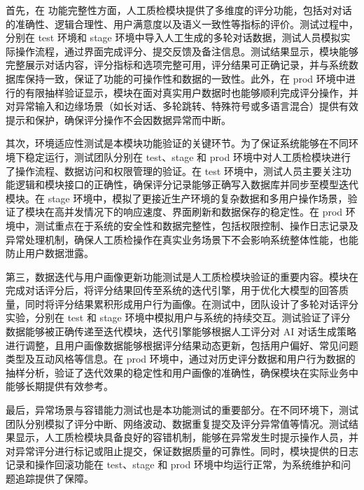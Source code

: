首先，在 功能完整性方面，人工质检模块提供了多维度的评分功能，包括对对话的准确性、逻辑合理性、用户满意度以及语义一致性等指标的评价。测试过程中，分别在 test 环境和 stage 环境中导入人工生成的多轮对话数据，测试人员模拟实际操作流程，通过界面完成评分、提交反馈及备注信息。测试结果显示，模块能够完整展示对话内容，评分指标和选项完整可用，评分结果可正确记录，并与系统数据库保持一致，保证了功能的可操作性和数据的一致性。此外，在 prod 环境中进行的有限抽样验证显示，模块在面对真实用户数据时也能够顺利完成评分操作，并对异常输入和边缘场景（如长对话、多轮跳转、特殊符号或多语言混合）提供有效提示和保护，确保评分操作不会因数据异常而中断。

其次，环境适应性测试是本模块功能验证的关键环节。为了保证系统能够在不同环境下稳定运行，测试团队分别在 test、stage 和 prod 环境中对人工质检模块进行了操作流程、数据访问和权限管理的验证。在 test 环境中，测试人员主要关注功能逻辑和模块接口的正确性，确保评分记录能够正确写入数据库并同步至模型迭代模块。在 stage 环境中，模拟了更接近生产环境的复杂数据和多用户操作场景，验证了模块在高并发情况下的响应速度、界面刷新和数据保存的稳定性。在 prod 环境中，测试重点在于系统的安全性和数据完整性，包括权限控制、操作日志记录及异常处理机制，确保人工质检操作在真实业务场景下不会影响系统整体性能，也能防止用户数据泄露。

第三，数据迭代与用户画像更新功能测试是人工质检模块验证的重要内容。模块在完成对话评分后，将评分结果回传至系统的迭代引擎，用于优化大模型的回答质量，同时将评分结果累积形成用户行为画像。在测试中，团队设计了多轮对话评分实验，分别在 test 和 stage 环境中模拟用户与系统的持续交互。测试验证了评分数据能够被正确传递至迭代模块，迭代引擎能够根据人工评分对 AI 对话生成策略进行调整，且用户画像数据能够根据评分结果动态更新，包括用户偏好、常见问题类型及互动风格等信息。在 prod 环境中，通过对历史评分数据和用户行为数据的抽样分析，验证了迭代效果的稳定性和用户画像的准确性，确保模块在实际业务中能够长期提供有效参考。

最后，异常场景与容错能力测试也是本功能测试的重要部分。在不同环境下，测试团队分别模拟了评分中断、网络波动、数据重复提交及评分异常值等情况。测试结果显示，人工质检模块具备良好的容错机制，能够在异常发生时提示操作人员，并对异常评分进行标记或阻止提交，保证数据质量的可靠性。同时，模块提供的日志记录和操作回滚功能在 test、stage 和 prod 环境中均运行正常，为系统维护和问题追踪提供了保障。
